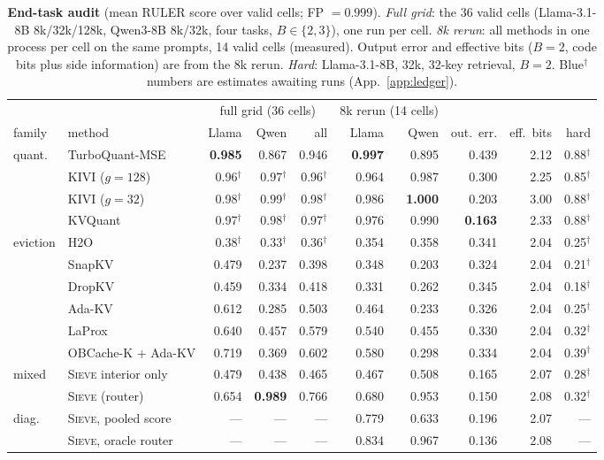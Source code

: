 \documentclass{article}
\newcommand{\est}[1]{{\color{estcol}#1$^{\dagger}$}}
\newcommand{\sieve}{\textsc{Sieve}}
\theoremstyle{definition}
\begin{document}
\begin{table}[t]
\centering
\footnotesize
\setlength{\tabcolsep}{2.6pt}
\caption{\textbf{End-task audit} (mean RULER score over valid cells; FP $=0.999$). \emph{Full grid}: the 36 valid cells (Llama-3.1-8B 8k/32k/128k, Qwen3-8B 8k/32k, four tasks, $B\in\{2,3\}$), one run per cell. \emph{8k rerun}: all methods in one process per cell on the same prompts, 14 valid cells (measured). Output error and effective bits ($B=2$, code bits plus side information) are from the 8k rerun. \emph{Hard}: Llama-3.1-8B, 32k, 32-key retrieval, $B=2$. \est{Blue} numbers are estimates awaiting runs (App.~\ref{app:ledger}).}
\label{tab:endtask}
\begin{tabular}{@{}llrrrrrrrr@{}}
\toprule
& & \multicolumn{3}{c}{full grid (36 cells)} & \multicolumn{2}{c}{8k rerun (14 cells)} & & & \\
\cmidrule(lr){3-5}\cmidrule(lr){6-7}
family & method & Llama & Qwen & all & Llama & Qwen & out.\ err. & eff.\ bits & hard \\
\midrule
\multirow{4}{*}{quant.} & TurboQuant-MSE & \textbf{0.985} & 0.867 & 0.946 & \textbf{0.997} & 0.895 & 0.439 & 2.12 & \est{0.88} \\
 & KIVI ($g{=}128$) & \est{0.96} & \est{0.97} & \est{0.96} & 0.964 & 0.987 & 0.300 & 2.25 & \est{0.85} \\
 & KIVI ($g{=}32$) & \est{0.98} & \est{0.99} & \est{0.98} & 0.986 & \textbf{1.000} & 0.203 & 3.00 & \est{0.88} \\
 & KVQuant & \est{0.97} & \est{0.98} & \est{0.97} & 0.976 & 0.990 & \textbf{0.163} & 2.33 & \est{0.88} \\
\midrule
\multirow{6}{*}{eviction} & H2O & \est{0.38} & \est{0.33} & \est{0.36} & 0.354 & 0.358 & 0.341 & 2.04 & \est{0.25} \\
 & SnapKV & 0.479 & 0.237 & 0.398 & 0.348 & 0.203 & 0.324 & 2.04 & \est{0.21} \\
 & DropKV & 0.459 & 0.334 & 0.418 & 0.331 & 0.262 & 0.345 & 2.04 & \est{0.18} \\
 & Ada-KV & 0.612 & 0.285 & 0.503 & 0.464 & 0.233 & 0.326 & 2.04 & \est{0.25} \\
 & LaProx & 0.640 & 0.457 & 0.579 & 0.540 & 0.455 & 0.330 & 2.04 & \est{0.32} \\
 & OBCache-K + Ada-KV & 0.719 & 0.369 & 0.602 & 0.580 & 0.298 & 0.334 & 2.04 & \est{0.39} \\
\midrule
\multirow{2}{*}{mixed} & \sieve{} interior only & 0.479 & 0.438 & 0.465 & 0.467 & 0.508 & 0.165 & 2.07 & \est{0.28} \\
 & \sieve{} (router) & 0.654 & \textbf{0.989} & 0.766 & 0.680 & 0.953 & 0.150 & 2.08 & \est{0.32} \\
\midrule
\multirow{2}{*}{diag.} & \sieve{}, pooled score & --- & --- & --- & 0.779 & 0.633 & 0.196 & 2.07 & --- \\
 & \sieve{}, oracle router & --- & --- & --- & 0.834 & 0.967 & 0.136 & 2.08 & --- \\
\bottomrule
\end{tabular}
\vspace{-2mm}
\end{table}
\end{document}
